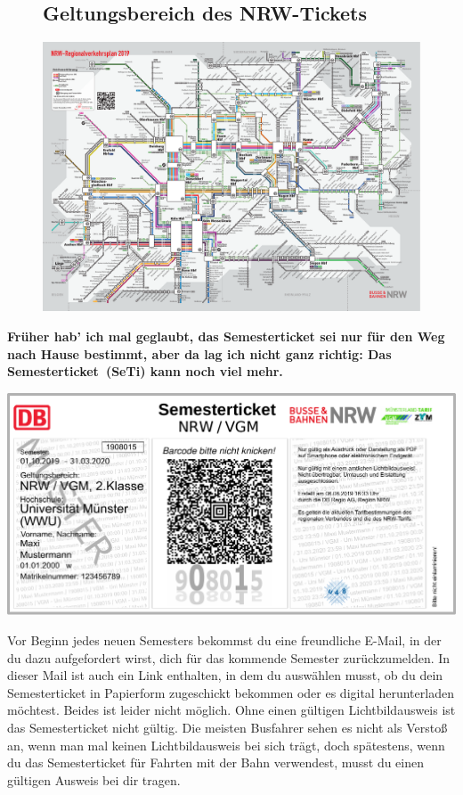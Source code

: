 \begin{multicols*}{2}
\begin{figure}[t]
	\subsection{Geltungsbereich des NRW-Tickets}
	\includegraphics[width=\textwidth]{res/regionalverkehrsplan_nrw.pdf}
\end{figure}
\textbf{Früher hab' ich mal geglaubt, das Semesterticket sei nur für den Weg nach Hause bestimmt, aber da lag ich nicht ganz richtig: Das Semesterticket~(SeTi) kann noch viel mehr.}

\includegraphics[width=\columnwidth]{res/semesterticket.pdf}

Vor Beginn jedes neuen Semesters bekommst du eine freundliche E-Mail, in der du dazu aufgefordert wirst, dich für das kommende Semester zurückzumelden. In dieser Mail ist auch ein Link enthalten, in dem du auswählen musst, ob du dein Semesterticket in Papierform zugeschickt bekommen oder es digital herunterladen möchtest. Beides ist leider nicht möglich.
Ohne einen gültigen Lichtbildausweis ist das Semesterticket nicht gültig.
Die meisten Busfahrer sehen es nicht als Verstoß an, wenn man mal keinen Lichtbildausweis bei sich trägt, doch spätestens, wenn du das Semesterticket für Fahrten mit der Bahn verwendest, musst du einen gültigen Ausweis bei dir tragen.


\end{multicols*}
